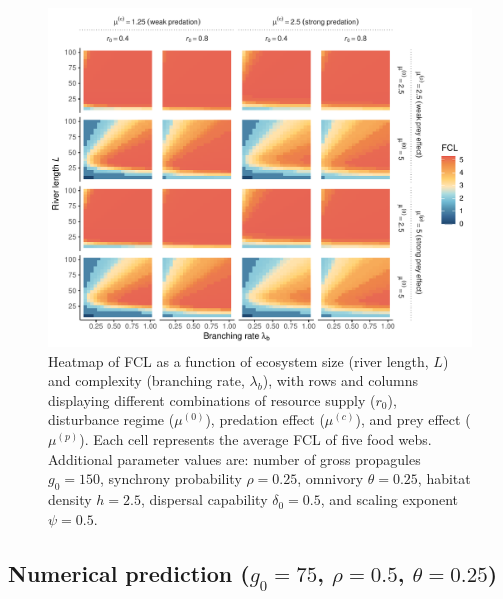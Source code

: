 \begin{figure}
\centering
\includegraphics{../data_fmt/fig_rho025_g150_theta025.pdf}
\caption{Heatmap of FCL as a function of ecosystem size (river length,
\(L\)) and complexity (branching rate, \(\lambda_b\)), with rows and
columns displaying different combinations of resource supply (\(r_0\)),
disturbance regime (\(\mu^{(0)}\)), predation effect (\(\mu^{(c)}\)),
and prey effect (\(\mu^{(p)}\)). Each cell represents the average FCL of
five food webs. Additional parameter values are: number of gross
propagules \(g_0=150\), synchrony probability \(\rho=0.25\), omnivory
\(\theta=0.25\), habitat density \(h=2.5\), dispersal capability
\(\delta_0=0.5\), and scaling exponent \(\psi=0.5\).}
\end{figure}

\newpage

\subsection{\texorpdfstring{Numerical prediction (\(g_0=75\),
\(\rho=0.5\),
\(\theta=0.25\))}{Numerical prediction (g\_0=75, \textbackslash rho=0.5, \textbackslash theta=0.25)}}\label{numerical-prediction-g_075-rho0.5-theta0.25}

